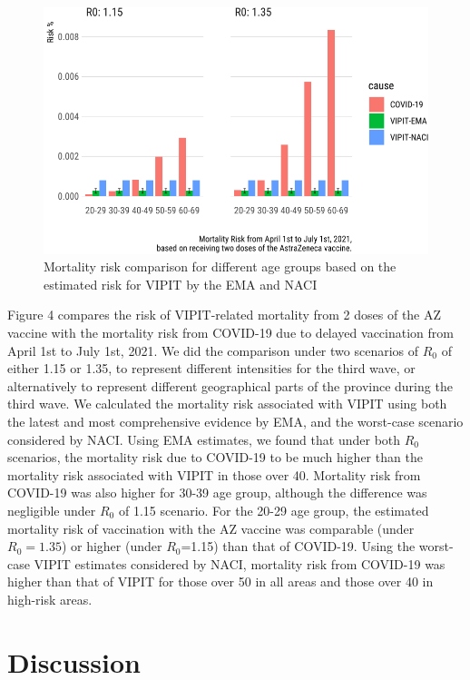 \documentclass[]{interact}
\theoremstyle{plain}%
\theoremstyle{definition}
\theoremstyle{remark}
\begin{document}
\begin{figure}

{\centering \includegraphics[width=0.9\linewidth]{theCaseforAZ_files/figure-latex/covidvsvipit-1} 

}

\caption{Mortality risk comparison for different age groups based on the estimated risk for VIPIT by the EMA and NACI}\label{fig:covidvsvipit}
\end{figure}

Figure 4 compares the risk of VIPIT-related mortality from 2 doses of
the AZ vaccine with the mortality risk from COVID-19 due to delayed
vaccination from April 1st to July 1st, 2021. We did the comparison
under two scenarios of \(R_0\) of either 1.15 or 1.35, to represent
different intensities for the third wave, or alternatively to represent
different geographical parts of the province during the third wave. We
calculated the mortality risk associated with VIPIT using both the
latest and most comprehensive evidence by EMA, and the worst-case
scenario considered by NACI. Using EMA estimates, we found that under
both \(R_0\) scenarios, the mortality risk due to COVID-19 to be much
higher than the mortality risk associated with VIPIT in those over 40.
Mortality risk from COVID-19 was also higher for 30-39 age group,
although the difference was negligible under \(R_0\) of 1.15 scenario.
For the 20-29 age group, the estimated mortality risk of vaccination
with the AZ vaccine was comparable (under \(R_0=1.35\)) or higher (under
\(R_0\)=1.15) than that of COVID-19. Using the worst-case VIPIT
estimates considered by NACI, mortality risk from COVID-19 was higher
than that of VIPIT for those over 50 in all areas and those over 40 in
high-risk areas.

\hypertarget{discussion}{%
\section{Discussion}\label{discussion}}
\end{document}
